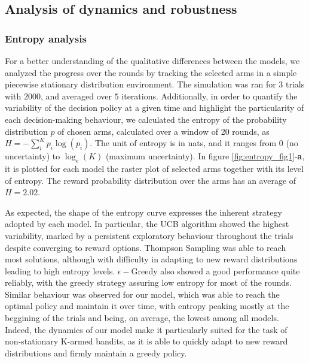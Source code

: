 \subsection{Analysis of dynamics and robustness}

\subsubsection{Entropy analysis}\label{sec:entropy}
\noindent For a better understanding of the qualitative differences between the models, we analyzed the progress over the rounds by tracking the selected arms in a simple piecewise stationary distribution environment.
The simulation was ran for $3$ trials with $2000$, and averaged over $5$ iterations.
Additionally, in order to quantify the variability of the decision policy at a given time and highlight the particularity of each decision-making behaviour, we calculated the entropy of the probability distribution $p$ of chosen arms, calculated over a window of 20 rounds, as $H=-\sum^{K}_{i} p_{i}\log(p_{i})$.
The unit of entropy is in nats, and it ranges from $0$ (no uncertainty) to $\log_{e}(K)$ (maximum uncertainty).
In figure \ref{fig:entropy_fig1}-\textbf{a}, it is plotted for each model the raster plot of selected arms together with its level of entropy. The reward probability distribution over the arms has an average of $H=2.02$.

As expected, the shape of the entropy curve expresses the inherent strategy adopted by each model.
In particular, the UCB algorithm showed the highest variability, marked by a persistent exploratory behaviour throughout the trials despite converging to reward options. Thompson Sampling was able to reach most solutions, although with difficulty in adapting to new reward distributions
leading to high entropy levels.
$\epsilon-$Greedy also showed a good performance quite reliably, with the greedy strategy assuring low entropy for most of the rounds.
Similar behaviour was observed for our model, which was able to reach the optimal policy and maintain it over time, with entropy peaking mostly at the beggining of the trials and being, on average, the lowest among all models.
Indeed, the dynamics of our model make it particularly suited for the task of non-stationary K-armed bandits, as it is able to quickly adapt to new reward distributions and firmly maintain a greedy policy.

